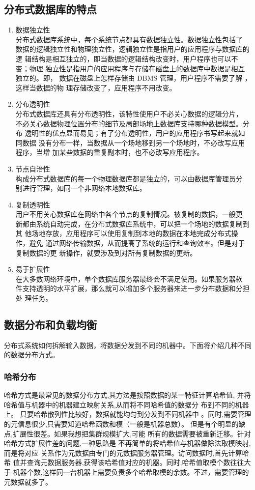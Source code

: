 \subsection{分布式数据库的特点}
\begin{enumerate}
	\item 数据独立性\\
	分布式数据库系统中，每个系统节点都具有数据独立性。数据独立性包括了
	数据的逻辑独立性和物理独立性，逻辑独立性是指用户的应用程序与数据库的逻
	辑结构是相互独立的，即当数据的逻辑结构改变时，用户程序也可以不变；物理
	独立性是指用户的应用程序与存储在磁盘上的数据库中数据是相互独立的。即，
	数据在磁盘上怎样存储由 DBMS 管理，用户程序不需要了解 ，这样当数据的物
	理存储改变了，应用程序不用改变。
	\item 分布透明性\\
	分布式数据库还具有分布透明性，该特性使用户不必关心数据的逻辑分片，
	不必关心数据物理位置分布的细节及局部场地上数据库支持哪种数据模型。分布
	透明性的优点显而易见；有了分布透明性，用户的应用程序书写起来就如同数据
	没有分布一样，当数据从一个场地移到另一个场地时，不必改写应用程序，当增
	加某些数据的重复副本时，也不必改写应用程序。
	\item 节点自治性\\
	构成分布式数据库的每一个物理数据库都是独立的，可以由数据库管理员分
	别进行管理，如同一个非网络本地数据库。
	\item 复制透明性\\
	用户不用关心数据库在网络中各个节点的复制情况。被复制的数据，一般更
	新都由系统自动完成，在分布式数据库系统中，可以把一个场地的数据复制到其
	他场地存放，应用程序可以使用复制到本地的数据在本地完成分布式操作，避免
	通过网络传输数据，从而提高了系统的运行和查询效率。但是对于复制数据的更
	新操作，就要涉及到对所有复制数据的更新。
	\item 易于扩展性\\
	在大多数网络环境中，单个数据库服务器最终会不满足使用。如果服务器软
	件支持透明的水平扩展，那么就可以增加多个服务器来进一步分布数据和分担处
	理任务。
\end{enumerate}
\subsection{数据分布和负载均衡}
分布式系统如何拆解输入数据，将数据分发到不同的机器中。下面将介绍几种不同的数据分布方式。 
\subsubsection{哈希分布}
哈希方式是最常见的数据分布方式,其方法是按照数据的某一特征计算哈希值,
并将哈希值与机器中的机器建立映射关系,从而将不同哈希值的数据分
布到不同的机器上。
只要哈希散列性比较好，数据就能均匀到分发到不同机器中
。同时,需要管理的元信息很少,只需要知道哈希函数和模（一般是机器总数）。 
但是有个明显的缺点,扩展性很差。如果我想把集群规模扩大,可能
所有的数据需要被重新迁移。针对哈希方式扩展性差的问题,一种思路是
不再简单的将哈希值与机器做除法取模映射,而是将对应
关系作为元数据由专门的元数据服务器管理。访问数据时,首先计算哈希
值并查询元数据服务器,获得该哈希值对应的机器。同时,哈希值取模个数往往大于
机器个数,这样同一台机器上需要负责多个哈希取模的余数。不过，需要管理的元数据就多了。 
